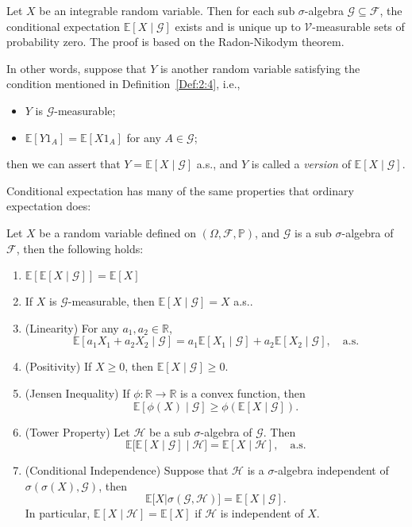 \begin{remark}
Let $X$ be an integrable random variable.
Then for each sub $\sigma$-algebra $\mathcal{G}\subseteq\mathcal{F}$, 
the conditional expectation $\mathbb{E}[X\mid\mathcal{G}]$ exists and 
is unique up to $\mathcal{V}$-measurable sets of probability zero.
The proof is based on the Radon-Nikodym theorem.

In other words,
suppose that $Y$ is another random variable satisfying the condition mentioned in Definition~\ref{Def:2:4}, i.e.,
\begin{itemize}
\item
$Y$ is $\mathcal{G}$-measurable;
\item
$\mathbb{E}[Y1_A] = \mathbb{E}[X1_A]$ for any $A\in\mathcal{G}$;
\end{itemize}
then we can assert that $Y = \mathbb{E}[X\mid\mathcal{G}]$ a.s., and $Y$ is called a \emph{version} of $\mathbb{E}[X\mid\mathcal{G}]$.
\end{remark}
Conditional expectation has many of the same properties that ordinary expectation does:
\begin{theorem}
Let $X$ be a random variable defined on $(\Omega,\mathcal{F},\mathbb{P})$, and $\mathcal{G}$ is a sub $\sigma$-algebra of $\mathcal{F}$, then the following holds:
\begin{enumerate}
\item
$\mathbb{E}[\mathbb{E}[X\mid\mathcal{G}]] = \mathbb{E}[X]$
\item
If $X$ is $\mathcal{G}$-measurable, then 
$\mathbb{E}[X\mid\mathcal{G}] = X$ a.s..
\item
(Linearity)
For any $a_1,a_2\in\mathbb{R}$, 
\[
\mathbb{E}[a_1X_1 + a_2X_2\mid \mathcal{G}]
=
a_1\mathbb{E}[X_1\mid \mathcal{G}]
+
a_2\mathbb{E}[X_2\mid \mathcal{G}],\quad\mbox{a.s.}
\]
\item
(Positivity)
If $X\ge0$, then $\mathbb{E}[X\mid\mathcal{G}]\ge0$.
\item
(Jensen Inequality)
If $\phi:\mathbb{R}\to\mathbb{R}$ is a convex function, 
then 
\[
\mathbb{E}[\phi(X)\mid\mathcal{G}]\ge\phi(\mathbb{E}[X\mid\mathcal{G}]).
\]
\item
(Tower Property)
Let $\mathcal{H}$ be a sub $\sigma$-algebra of $\mathcal{G}$.
Then 
\[
\mathbb{E}\bigg[\mathbb{E}[X\mid\mathcal{G}]\mid\mathcal{H}\bigg]
=
\mathbb{E}[X\mid\mathcal{H}],\quad\mbox{a.s.}
\]
\item
(Conditional Independence)
Suppose that $\mathcal{H}$ is a $\sigma$-algebra independent of $\sigma(\sigma(X),\mathcal{G})$,
then 
\[
\mathbb{E}\bigg[
X\bigg|
\sigma(\mathcal{G},\mathcal{H})
\bigg]
=
\mathbb{E}[X\mid\mathcal{G}].
\]
In particular, $\mathbb{E}[X\mid\mathcal{H}] = \mathbb{E}[X]$ if $\mathcal{H}$ is independent of $X$.
\end{enumerate}
\end{theorem}
